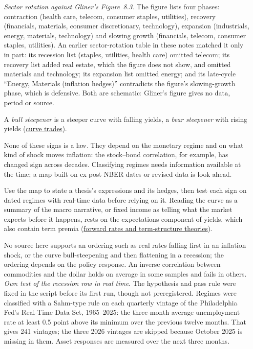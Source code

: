 \begin{qfdefinition}
\emph{Sector rotation against Gliner's Figure~8.3}. The figure lists four phases: contraction (health care, telecom, consumer staples, utilities), recovery (financials, materials, consumer discretionary, technology), expansion (industrials, energy, materials, technology) and slowing growth (financials, telecom, consumer staples, utilities). An earlier sector-rotation table in these notes matched it only in part: its recession list (staples, utilities, health care) omitted telecom; its recovery list added real estate, which the figure does not show, and omitted materials and technology; its expansion list omitted energy; and its late-cycle ``Energy, Materials (inflation hedges)'' contradicts the figure's slowing-growth phase, which is defensive. Both are schematic: Gliner's figure gives no data, period or source.

 A \emph{bull steepener} is a steeper curve with falling yields, a \emph{bear steepener} with rising yields (\hyperref[meth:curve-trades-carry-rolldown]{curve trades}).

 None of these signs is a law. They depend on the monetary regime and on what kind of shock moves inflation: the stock--bond correlation, for example, has changed sign across decades. Classifying regimes needs information available at the time; a map built on ex post NBER dates or revised data is look-ahead.

 Use the map to state a thesis's expressions and its hedges, then test each sign on dated regimes with real-time data before relying on it. Reading the curve as a summary of the macro narrative, or fixed income as telling what the market expects before it happens, rests on the expectations component of yields, which also contain term premia (\hyperref[mod:forward-rates-fra]{forward rates and term-structure theories}).

 No source here supports an ordering such as real rates falling first in an inflation shock, or the curve bull-steepening and then flattening in a recession; the ordering depends on the policy response. An inverse correlation between commodities and the dollar holds on average in some samples and fails in others. \emph{Own test of the recession row in real time}. The hypothesis and pass rule were fixed in the script before its first run, though not preregistered. Regimes were classified with a Sahm-type rule on each quarterly vintage of the Philadelphia Fed's Real-Time Data Set, 1965--2025: the three-month average unemployment rate at least 0.5 point above its minimum over the previous twelve months. That gives 241 vintages; the three 2026 vintages are skipped because October 2025 is missing in them. Asset responses are measured over the next three months.


\end{qfdefinition}
